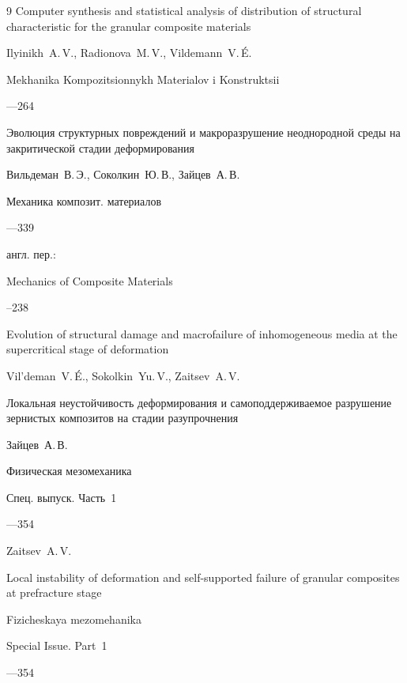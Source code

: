 \begin{thebibliography}{9}
\paper Computer synthesis and statistical analysis of distribution of structural characteristic for the granular composite materials

\by Ilyinikh~A.\,V., Radionova~M.\,V., Vildemann~V.\,\'E.

\jour Mekhanika Kompozitsionnykh Materialov i Konstruktsii




—264




\paper Эволюция структурных повреждений и макроразрушение неоднородной среды на закритической стадии деформирования 

\by Вильдеман~В.\,Э., Соколкин~Ю.\,В., Зайцев~А.\,В.

\jour Механика композит. материалов 




—339

\transl англ. пер.:~

\jour Mechanics of Composite Materials



--238


\paper Evolution of structural damage and macrofailure of inho\-mo\-geneous media at the supercritical stage of deformation

\by Vil'deman~V.\,\'E.,  Sokolkin~Yu.\,V., Zaitsev~A.\,V.






\paper Локальная неустойчивость деформирования и самоподдерживаемое разрушение зернистых композитов на стадии разупрочнения 

\by Зайцев~А.\,В.

\jour Физическая мезомеханика 	


\issueinfo Спец. выпуск. Часть~1


—354

\misctransl

\by Zaitsev~A.\,V.

\paper Local instability of deformation and self-supported failure of granular composites at prefracture stage

\jour Fizicheskaya mezomehanika


\issueinfo Special Issue. Part~1


—354





\end{thebibliography}



